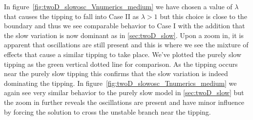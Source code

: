 In figure~\ref{fig:twoD_slowosc_Vnumerics_medium} we have chosen a value of $\lambda$ that causes the tipping to fall into Case II as $\lambda>1$ but this choice is close to the boundary and thus we see comparable behavior to Case I with the addition that the slow variation is now dominant as in \autoref{sec:twoD_slow}. Upon a zoom in, it is apparent that oscillations are still present and this is where we see the mixture of effects that cause a similar tipping to take place. We've plotted the purely slow tipping as the green vertical dotted line for comparison. As the tipping occurs near the purely slow tipping this confirms that the slow variation is indeed dominating the tipping. In figure~\ref{fig:twoD_slowosc_Tnumerics_medium} we again see very similar behavior to the purely slow model in \autoref{sec:twoD_slow} but the zoom in further reveals the oscillations are present and have minor influence by forcing the solution to cross the unstable branch near the tipping.

